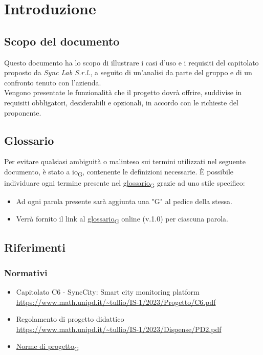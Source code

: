 \section{Introduzione}
\setcounter{subsection}{0}
\subsection{Scopo del documento}
Questo documento ha lo scopo di illustrare i casi d'uso e i requisiti del capitolato
proposto da \textit{Sync Lab S.r.l.}, a seguito di un'analisi da parte del gruppo
e di un confronto tenuto con l'azienda.\\
Vengono presentate le funzionalità che il progetto dovrà offrire, suddivise in requisiti obbligatori,
desiderabili e opzionali, in accordo con le richieste del proponente.

\subsection{Glossario}
Per evitare qualsiasi ambiguità o malinteso sui termini utilizzati nel seguente documento,
è stato a io\textsubscript{G}, contenente le definizioni necessarie. È possibile individuare ogni termine presente
nel \href{https://7last.github.io/docs/rtb/documentazione-interna/glossario#glossario}{glossario\textsubscript{G}}
grazie ad uno stile specifico:
\begin{itemize}
	\item Ad ogni parola presente sarà aggiunta una "G" al pedice della stessa.
	\item Verrà fornito il link al
	      \href{https://7last.github.io/docs/rtb/documentazione-interna/glossario#glossario}{glossario\textsubscript{G}} online (v.1.0) per ciascuna parola.

\end{itemize}

\subsection{Riferimenti}
\subsubsection{Normativi}
\begin{itemize}
	\item Capitolato C6 - SyncCity: Smart city monitoring platform\\
	      \url{https://www.math.unipd.it/~tullio/IS-1/2023/Progetto/C6.pdf}
	\item Regolamento di progetto didattico\\
	      \url{https://www.math.unipd.it/~tullio/IS-1/2023/Dispense/PD2.pdf}
	\item \href{https://7last.github.io/docs/rtb/documentazione-interna/glossario#norme-di-progetto}{Norme di progetto\textsubscript{G}}
\end{itemize}

